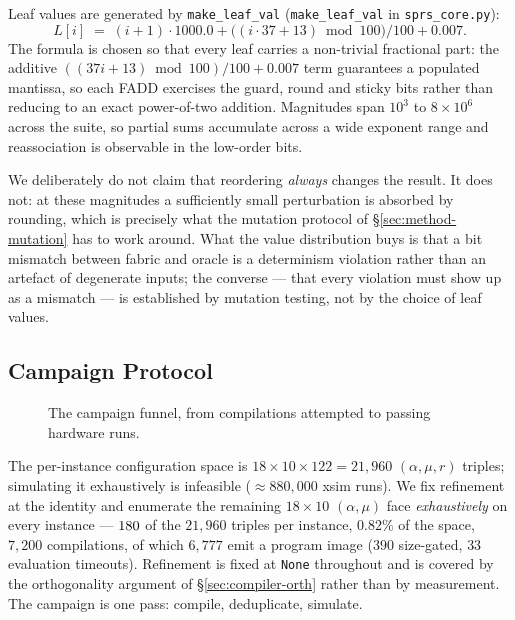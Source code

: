 \documentclass[journal,10pt]{IEEEtran}
\theoremstyle{plain}
\theoremstyle{definition}
\theoremstyle{remark}
\newcommand{\sv}[1]{\texttt{#1}}
\newcommand{\asgn}{\ensuremath{\alpha}}
\newcommand{\map}{\ensuremath{\mu}}
\begin{document}
Leaf values are generated by \sv{make\_leaf\_val}
(\sv{make\_leaf\_val} in \sv{sprs\_core.py}):
\begin{equation}\label{eq:leaves}
L[i] \;=\; (i+1)\cdot 1000.0 + \bigl((i \cdot 37 + 13) \bmod 100\bigr)/100 + 0.007.
\end{equation}
The formula is chosen so that every leaf carries a non-trivial fractional
part: the additive $((37i+13) \bmod 100)/100 + 0.007$ term guarantees a
populated mantissa, so each FADD exercises the guard, round and sticky bits
rather than reducing to an exact power-of-two addition. Magnitudes span
$10^3$ to $8\times10^6$ across the suite, so partial sums accumulate across a
wide exponent range and reassociation is observable in the low-order bits.

We deliberately do not claim that reordering \emph{always} changes the
result. It does not: at these magnitudes a sufficiently small perturbation is
absorbed by rounding, which is precisely what the mutation protocol of
\S\ref{sec:method-mutation} has to work around. What the value distribution
buys is that a bit mismatch between fabric and oracle is a determinism
violation rather than an artefact of degenerate inputs; the converse --- that
every violation must show up as a mismatch --- is established by mutation
testing, not by the choice of leaf values.

\subsection{Campaign Protocol}\label{sec:method-tour}

\begin{figure}[!t]\centering

\caption{The campaign funnel, from compilations attempted to passing hardware runs.}\label{fig:campaign}
\end{figure}


The per-instance configuration space is $18\times10\times122 = 21{,}960$
$(\asgn, \map, r)$ triples; simulating it exhaustively is infeasible
(${\approx}880{,}000$ xsim runs). We fix refinement at the identity and
enumerate the remaining $18\times10$ $(\asgn, \map)$ face \emph{exhaustively}
on every instance --- $180$ of the $21{,}960$ triples per instance, $0.82\%$
of the space, $7{,}200$ compilations, of which $6{,}777$ emit a program image
($390$ size-gated, $33$ evaluation timeouts). Refinement is fixed at
\sv{None} throughout and is covered by the orthogonality argument of
\S\ref{sec:compiler-orth} rather than by measurement. The campaign is one
pass: compile, deduplicate, simulate.
\end{document}
